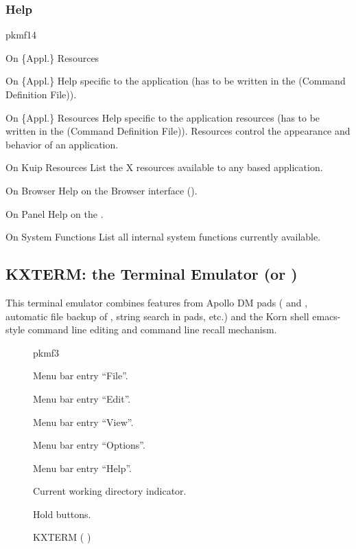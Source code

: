 \subsubsection*{Help}
\begin{PICTf}[.28] {pkmf14}
\begin{DLsf}{On \{Appl.\} Resources}
\item[On \{Appl.\}]
         Help specific to the application (has to be written
         in the \CDF{} (Command Definition File)).
\item[On \{Appl.\} Resources]
         Help specific to the application resources
         (has to be written in the \CDF{} (Command Definition File)).
         Resources control the appearance and behavior of an application.
\item[On Kuip Resources]
         List the X resources available to any \KUIPMotif{}
         based application.
\item[On Browser]
         Help on the \KUIPMotif{} Browser interface (\MB{}).
\item[On Panel]
         Help on the \KUIPMotif{} \PNI{}.
\item[On System Functions]
         List \KUIP{} all internal system functions currently available.
\end{DLsf}
\end{PICTf}


\subsection{KXTERM: the \KUIP{} Terminal Emulator (or \EW{})}
\label{ref:rekxterm}

This terminal emulator combines features from
Apollo DM pads (\INP{} and \TP{}, automatic file backup 
of \TP{}, string search in pads, etc.) and the Korn shell 
emacs-style command line editing and command line recall mechanism.

\begin{figure}[tb]\centering
\begin{PICTf}[.73]{pkmf3}
\begin{EnumZW}
\item Menu bar entry ``File''.
\item Menu bar entry ``Edit''.
\item Menu bar entry ``View''.
\item Menu bar entry ``Options''.
\item Menu bar entry ``Help''.
\end{EnumZW}
\begin{EnumZB}
\item \INP{}
\item \TP{}
\item Current working directory indicator.
\item Hold buttons.
\end{EnumZB}
\end{PICTf}
\caption{KXTERM (\KUIPMotif{} \EW{})
\label{ref:FIGPKMF3}}
\end{figure}

